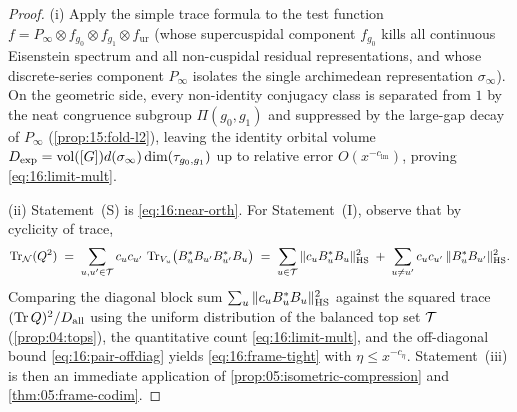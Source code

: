 
\begin{proof}
(i) Apply the simple trace formula to the test function $f = P_\infty \otimes f_{g_0} \otimes f_{g_1} \otimes f_{\mathrm{ur}}$ (whose supercuspidal component $f_{g_0}$ kills all continuous Eisenstein spectrum and all non-cuspidal residual representations, and whose discrete-series component $P_\infty$ isolates the single archimedean representation $\sigma_\infty$). On the geometric side, every non-identity conjugacy class is separated from $1$ by the neat congruence subgroup $\Pi(g_0, g_1)$ and suppressed by the large-gap decay of $P_\infty$ (\cref{prop:15:fold-l2}), leaving the identity orbital volume $D_{\mathrm{exp}} = \operatorname{vol}([G]) d(\sigma_\infty)\dim(\tau_{g_0, g_1})$ up to relative error $O(x^{-c_{\mathrm{lm}}})$, proving \eqref{eq:16:limit-mult}.

(ii) Statement~(S) is \eqref{eq:16:near-orth}. For Statement~(I), observe that by cyclicity of trace,
\[
  \operatorname{Tr}_{\mathcal{N}}(Q^2) \;=\; \sum_{u, u' \in \mathcal{T}} c_u c_{u'}\, \operatorname{Tr}_{V_u}\bigl(B_u^* B_{u'} B_{u'}^* B_u\bigr)
  \;=\; \sum_{u \in \mathcal{T}} \|c_u B_u^* B_u\|_{\mathrm{HS}}^2 \;+\; \sum_{u \neq u'} c_u c_{u'}\, \|B_u^* B_{u'}\|_{\mathrm{HS}}^2.
\]
Comparing the diagonal block sum $\sum_u \|c_u B_u^* B_u\|_{\mathrm{HS}}^2$ against the squared trace $(\operatorname{Tr} Q)^2 / D_{\mathrm{all}}$ using the uniform distribution of the balanced top set $\mathcal{T}$ (\cref{prop:04:tops}), the quantitative count \eqref{eq:16:limit-mult}, and the off-diagonal bound \eqref{eq:16:pair-offdiag} yields \eqref{eq:16:frame-tight} with $\eta \le x^{-c_\eta}$. Statement~(iii) is then an immediate application of \cref{prop:05:isometric-compression} and \cref{thm:05:frame-codim}.
\end{proof}
